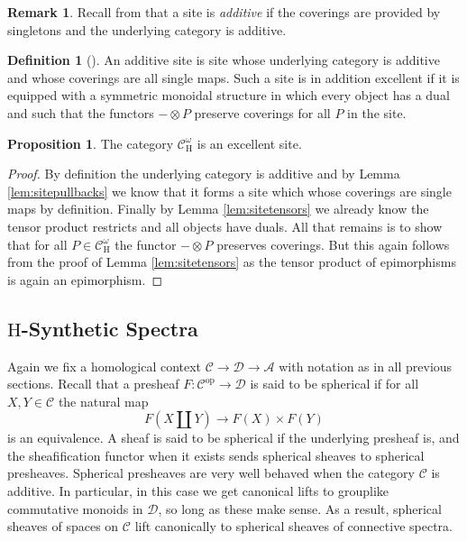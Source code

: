 \documentclass[10pt]{amsart}
\theoremstyle{definition}
\numberwithin{figure}{section}
\numberwithin{equation}{section}
\newtheorem{proposition}[figure]{Proposition}
\newtheorem{definition}[figure]{Definition}
\newtheorem{remark}[figure]{Remark}
\newcommand{\op}{\mathrm{op}}
\newcommand{\cA}{\mathcal{A}}
\newcommand{\cC}{\mathcal{C}}
\newcommand{\cD}{\mathcal{D}}
\theoremstyle{cited}
\renewcommand{\H}{\mathrm{H}}
\begin{document}
\begin{remark}
  Recall from \cite{Pst22} that a site is \textit{additive} if the coverings are provided by singletons and the underlying category is additive. 
\end{remark}

\begin{definition}[\cite{Pst22}]
  An additive site is site whose underlying category is additive and whose coverings are all single maps. Such a site is in addition excellent if it is equipped with a symmetric monoidal structure in which every object has a dual and such that the functors $-\otimes P$ preserve coverings for all $P$ in the site.
\end{definition}

\begin{proposition}
  The category $\cC^\omega_\H$ is an excellent site.
\end{proposition}

\begin{proof}
  By definition the underlying category is additive and by Lemma \ref{lem:sitepullbacks} we know that it forms a site which whose coverings are single maps by definition. Finally by Lemma \ref{lem:sitetensors} we already know the tensor product restricts and all objects have duals. All that remains is to show that for all $P\in \cC^\omega_\H$ the functor $-\otimes P$ preserves coverings. But this again follows from the proof of Lemma \ref{lem:sitetensors} as the tensor product of epimorphisms is again an epimorphism.
\end{proof}

\subsection{$\H$-Synthetic Spectra}

Again we fix a homological context $\cC\to \cD\to \cA$ with notation as in all previous sections. Recall that a presheaf $F:\cC^\op\to \cD$ is said to be spherical if for all $X,Y\in \cC$ the natural map
\[
F(X\amalg Y)\to F(X)\times F(Y)
\]
is an equivalence. A sheaf is said to be spherical if the underlying presheaf is, and the sheafification functor when it exists sends spherical sheaves to spherical presheaves. Spherical presheaves are very well behaved when the category $\cC$ is additive. In particular, in this case we get canonical lifts to grouplike commutative monoids in $\cD$, so long as these make sense. As a result, spherical sheaves of spaces on $\cC$ lift canonically to spherical sheaves of connective spectra.
\end{document}
